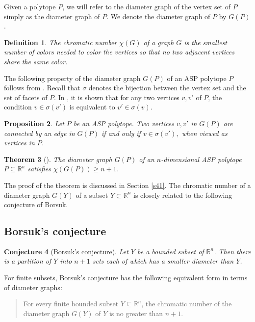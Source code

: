 \documentclass[12pt]{amsart}
\theoremstyle{plain}
\newtheorem{theorem}{Theorem}[section]
\newtheorem{proposition}[theorem]{Proposition}
\newtheorem{conjecture}[theorem]{Conjecture}
\newtheorem{definition}[theorem]{Definition}
\newcommand{\R}{\mathbb{R}}
\numberwithin{equation}{section}
\begin{document}
Given a polytope $P$, we will refer to the
diameter graph of the vertex set of $P$ simply as the diameter graph
of $P$.  We denote the diameter graph of $P$ by $G(P)$.  

\begin{definition}
The \emph{chromatic number} $\chi(G)$ of a graph $G$ is the smallest
number of colors needed to color the vertices so that no two adjacent
vertices share the same color.
\end{definition}

The following property of the diameter graph $G(P)$ of an ASP polytope
$P$ follows from \cite[Lemma~2 and Lemma~3]{lovasz1983self}.  Recall
that $\sigma$ denotes the bijection between the vertex set and the set
of facets of $P$. In \cite[Lemma~1]{lovasz1983self}, it is shown that
for any two vertices $v, v'$ of $P$, the condition $v\in \sigma(v')$
is equivalent to $v'\in \sigma(v)$.



\begin{proposition}\label{prop:diam_graph_asp}
Let $P$ be an ASP polytope.  Two vertices $v, v'$ in $G(P)$ are
connected by an edge in $G(P)$ if and only if $v\in \sigma(v'),$ when
viewed as vertices in $P$.
\end{proposition}


\begin{theorem}[{\cite[Theorem~2]{lovasz1983self}}]\label{thm:lower_bound_on_chromatic_number}
The diameter graph $G(P)$ of an $n$-dimensional ASP polytope
$P\subseteq\R^n$ satisfies $\chi(G(P))\geq n+1$.
\end{theorem}

The proof of the theorem is discussed in Section \ref{s41}.  The
chromatic number of a diameter graph $G(Y)$ of a subset $Y\subset\R^n$
is closely related to the following conjecture of Borsuk.


\subsection{Borsuk's conjecture}\label{subsec:Borsuk_conjecture}

\begin{conjecture}
[Borsuk's conjecture]\label{conj:Borsuk} Let $Y$ be a bounded subset
of $\R^n$. Then there is a partition of $Y$ into $n+1$ sets each of
which has a smaller diameter than $Y$.
\end{conjecture}


For finite subsets, Borsuk's conjecture has the following equivalent
form in terms of diameter graphs:
\begin{quote}
For every finite bounded subset $Y\subseteq\R^n$, the chromatic number
of the diameter graph $G(Y)$ of $Y$ is no greater than $n+1$.
\end{quote}
\end{document}
